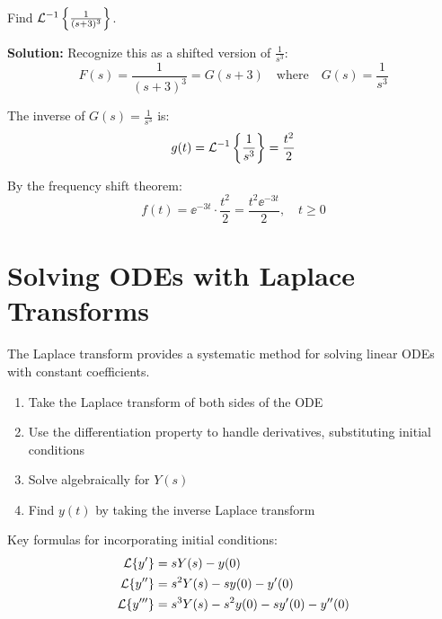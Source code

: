 \begin{examplebox}[title=Example: Frequency Shifting]
Find $\mathcal{L}^{-1}\left\{ \frac{1}{(s+3)^3} \right\}$.

\textbf{Solution:}
Recognize this as a shifted version of $\frac{1}{s^3}$:
\begin{equation}
F(s) = \frac{1}{(s+3)^3} = G(s+3) \quad \text{where} \quad G(s) = \frac{1}{s^3}
\end{equation}

The inverse of $G(s) = \frac{1}{s^3}$ is:
\begin{equation}
g(t) = \mathcal{L}^{-1}\left\{\frac{1}{s^3}\right\} = \frac{t^2}{2}
\end{equation}

By the frequency shift theorem:
\begin{equation}
\boxed{f(t) = \ee^{-3t} \cdot \frac{t^2}{2} = \frac{t^2\ee^{-3t}}{2}, \quad t \geq 0}
\end{equation}
\end{examplebox}

\section{Solving ODEs with Laplace Transforms}

The Laplace transform provides a systematic method for solving linear ODEs with constant coefficients.

\begin{keyconceptbox}[title=Procedure for Solving ODEs with Laplace Transforms]
\begin{enumerate}
    \item Take the Laplace transform of both sides of the ODE
    \item Use the differentiation property to handle derivatives, substituting initial conditions
    \item Solve algebraically for $Y(s)$
    \item Find $y(t)$ by taking the inverse Laplace transform
\end{enumerate}
\end{keyconceptbox}

Key formulas for incorporating initial conditions:
\begin{align}
\mathcal{L}\{y'\} &= sY(s) - y(0) \\
\mathcal{L}\{y''\} &= s^2Y(s) - sy(0) - y'(0) \\
\mathcal{L}\{y'''\} &= s^3Y(s) - s^2y(0) - sy'(0) - y''(0)
\end{align}

